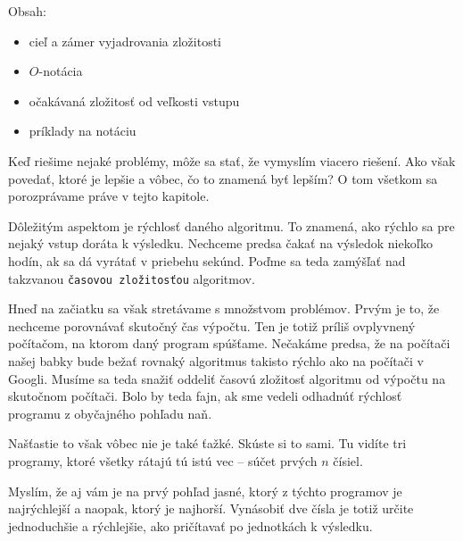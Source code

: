 %





Obsah:
\begin{itemize}
    \item cieľ a zámer vyjadrovania zložitosti
    \item $O$-notácia
    \item očakávaná zložitosť od veľkosti vstupu
    \item príklady na notáciu
\end{itemize}

Keď riešime nejaké problémy, môže sa stať, že vymyslím viacero riešení. Ako však povedať, ktoré je
lepšie a vôbec, čo to znamená byť lepším? O tom všetkom sa porozprávame práve v tejto kapitole.

Dôležitým aspektom je rýchlosť daného algoritmu. To znamená, ako rýchlo sa pre nejaký vstup doráta k
výsledku. Nechceme predsa čakať na výsledok niekoľko hodín, ak sa dá vyrátať v priebehu sekúnd.
Poďme sa teda zamýšľať nad takzvanou \texttt{časovou zložitosťou} algoritmov.

Hneď na začiatku sa však stretávame s množstvom problémov. Prvým je to, že nechceme porovnávať
skutočný čas výpočtu. Ten je totiž príliš ovplyvnený počítačom, na ktorom daný program spúšťame.
Nečakáme predsa, že na počítači našej babky bude bežať rovnaký algoritmus takisto rýchlo ako na
počítači v Googli. Musíme sa teda snažiť oddeliť časovú zložitosť algoritmu od výpočtu na skutočnom
počítači. Bolo by teda fajn, ak sme vedeli odhadnúť rýchlosť programu z obyčajného pohľadu naň.

Našťastie to však vôbec nie je také ťažké. Skúste si to sami. Tu vidíte tri programy, ktoré všetky
rátajú tú istú vec -- súčet prvých $n$ čísiel.




Myslím, že aj vám je na prvý pohľad jasné, ktorý z týchto programov je najrýchlejší a naopak, ktorý je
najhorší. Vynásobiť dve čísla je totiž určite jednoduchšie a rýchlejšie, ako pričítavať po
jednotkách k výsledku.

